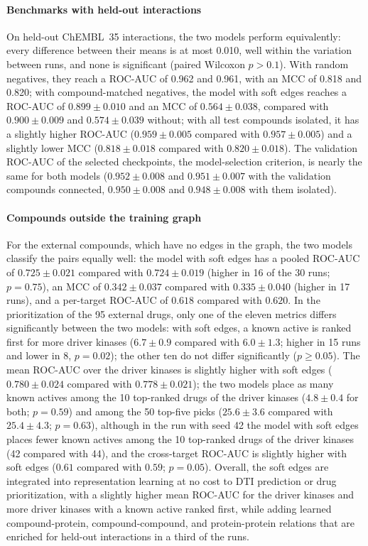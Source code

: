 \documentclass[11pt,letterpaper]{article}
\begin{document}
\paragraph{Benchmarks with held-out interactions}
On held-out ChEMBL~35 interactions, the two models perform equivalently: every difference between their means is at most 0.010, well within the variation between runs, and none is significant (paired Wilcoxon $p>0.1$). With random negatives, they reach a ROC-AUC of 0.962 and 0.961, with an MCC of 0.818 and 0.820; with compound-matched negatives, the model with soft edges reaches a ROC-AUC of $0.899\pm0.010$ and an MCC of $0.564\pm0.038$, compared with $0.900\pm0.009$ and $0.574\pm0.039$ without; with all test compounds isolated, it has a slightly higher ROC-AUC ($0.959\pm0.005$ compared with $0.957\pm0.005$) and a slightly lower MCC ($0.818\pm0.018$ compared with $0.820\pm0.018$). The validation ROC-AUC of the selected checkpoints, the model-selection criterion, is nearly the same for both models ($0.952\pm0.008$ and $0.951\pm0.007$ with the validation compounds connected, $0.950\pm0.008$ and $0.948\pm0.008$ with them isolated).

\paragraph{Compounds outside the training graph}
For the external compounds, which have no edges in the graph, the two models classify the pairs equally well: the model with soft edges has a pooled ROC-AUC of $0.725\pm0.021$ compared with $0.724\pm0.019$ (higher in 16 of the 30 runs; $p=0.75$), an MCC of $0.342\pm0.037$ compared with $0.335\pm0.040$ (higher in 17 runs), and a per-target ROC-AUC of $0.618$ compared with $0.620$. In the prioritization of the 95 external drugs, only one of the eleven metrics differs significantly between the two models: with soft edges, a known active is ranked first for more driver kinases ($6.7\pm0.9$ compared with $6.0\pm1.3$; higher in 15 runs and lower in 8, $p=0.02$); the other ten do not differ significantly ($p\geq0.05$). The mean ROC-AUC over the driver kinases is slightly higher with soft edges ($0.780\pm0.024$ compared with $0.778\pm0.021$); the two models place as many known actives among the 10 top-ranked drugs of the driver kinases ($4.8\pm0.4$ for both; $p=0.59$) and among the 50 top-five picks ($25.6\pm3.6$ compared with $25.4\pm4.3$; $p=0.63$), although in the run with seed 42 the model with soft edges places fewer known actives among the 10 top-ranked drugs of the driver kinases (42 compared with 44), and the cross-target ROC-AUC is slightly higher with soft edges ($0.61$ compared with $0.59$; $p=0.05$). Overall, the soft edges are integrated into representation learning at no cost to DTI prediction or drug prioritization, with a slightly higher mean ROC-AUC for the driver kinases and more driver kinases with a known active ranked first, while adding learned compound-protein, compound-compound, and protein-protein relations that are enriched for held-out interactions in a third of the runs.
\end{document}
